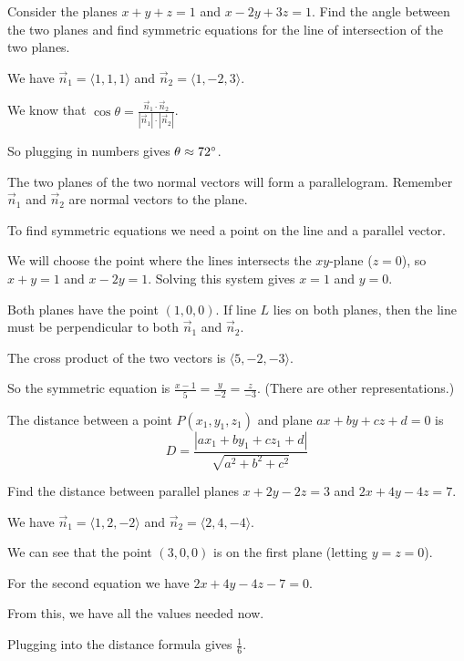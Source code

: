 \documentclass[../calc3.tex]{subfiles}
\begin{document}
\begin{example}
    Consider the planes $x+y+z=1$ and $x-2y+3z=1$. Find the angle between the two planes and find symmetric equations for the line of intersection of the two planes.

    We have $\vec{n}_1=\langle 1,1,1\rangle$ and $\vec{n}_2=\langle 1,-2,3\rangle$.

    We know that $\cos\theta = \frac{\vec{n}_1\cdot \vec{n}_2}{|\vec{n}_1|\cdot |\vec{n}_2|}$.

    So plugging in numbers gives $\theta \approx 72\degree$.

    The two planes of the two normal vectors will form a parallelogram. Remember $\vec{n}_1$ and $\vec{n}_2$ are normal vectors to the plane. 

    To find symmetric equations we need a point on the line and a parallel vector.

    We will choose the point where the lines intersects the $xy$-plane ($z=0$), so $x+y=1$ and $x-2y=1$. Solving this system gives $x=1$ and $y=0$.

    Both planes have the point $(1,0,0)$. If line $L$ lies on both planes, then the line must be perpendicular to both $\vec{n}_1$ and $\vec{n}_2$.

    The cross product of the two vectors is $\langle 5,-2,-3\rangle$.

    So the symmetric equation is $\frac{x-1}{5}=\frac{y}{-2}=\frac{z}{-3}$. (There are other representations.)
\end{example}

\begin{theorem}
    The distance between a point $P(x_1,y_1,z_1)$ and plane $ax+by+cz+d=0$ is 
    \[ D=\frac{|ax_1+by_1+cz_1+d|}{\sqrt{a^2+b^2+c^2}} \]
\end{theorem}

\begin{example}
    Find the distance between parallel planes $x+2y-2z=3$ and $2x+4y-4z=7$.

    We have $\vec{n}_1=\langle 1,2,-2\rangle$ and $\vec{n}_2=\langle 2,4,-4\rangle$.

    We can see that the point $(3,0,0)$ is on the first plane (letting $y=z=0$).

    For the second equation we have $2x+4y-4z-7=0$.

    From this, we have all the values needed now.

    Plugging into the distance formula gives $\frac{1}{6}$.
\end{example}
\end{document}
